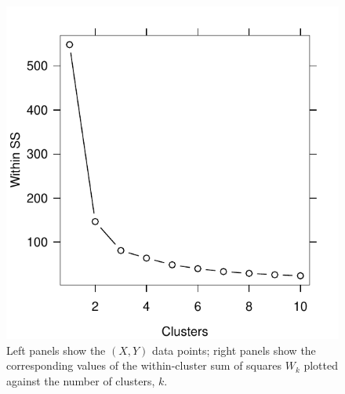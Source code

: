 \documentclass[12pt]{article}
\begin{document}
\begin{figure}
\begin{minipage}{\linewidth}
\begin{minipage}{0.45\linewidth}
  \end{minipage}
  \hspace{0.05in}
  \begin{minipage}{0.45\linewidth}
    \includegraphics[width=\linewidth]{main_code/demo/elbow/incorrect-withinss.pdf}
  \end{minipage}
\end{minipage}
\caption{Left panels show the $(X,Y)$ data points; right panels
  show the corresponding values of the within-cluster sum of squares $W_k$
plotted against the number of clusters, $k$.}
\label{fig:elbow}
\end{figure}
\end{document}
